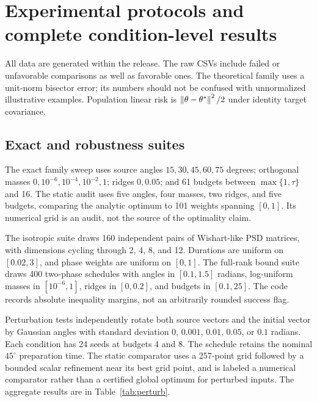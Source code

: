 \section{Experimental protocols and complete condition-level results}\label{app:experiments}
All data are generated within the release. The raw CSVs include failed or unfavorable comparisons as well as favorable ones. The theoretical family uses a unit-norm bisector error; its numbers should not be confused with unnormalized illustrative examples. Population linear risk is $\left\lVert\theta-\theta^*\right\rVert^2/2$ under identity target covariance.

\subsection{Exact and robustness suites}
The exact family sweep uses source angles $15,30,45,60,75$ degrees; orthogonal masses $0,10^{-6},10^{-4},10^{-2},1$; ridges $0,0.05$; and 61 budgets between $\max\{1,\tau\}$ and 16. The static audit uses five angles, four masses, two ridges, and five budgets, comparing the analytic optimum to 101 weights spanning $[0,1]$. Its numerical grid is an audit, not the source of the optimality claim.

The isotropic suite draws 160 independent pairs of Wishart-like PSD matrices, with dimensions cycling through 2, 4, 8, and 12. Durations are uniform on $[0.02,3]$, and phase weights are uniform on $[0,1]$. The full-rank bound suite draws 400 two-phase schedules with angles in $[0.1,1.5]$ radians, log-uniform masses in $[10^{-6},1]$, ridges in $[0,0.2]$, and budgets in $[0.1,25]$. The code records absolute inequality margins, not an arbitrarily rounded success flag.

Perturbation tests independently rotate both source vectors and the initial vector by Gaussian angles with standard deviation $0$, $0.001$, $0.01$, $0.05$, or $0.1$ radians. Each condition has 24 seeds at budgets 4 and 8. The schedule retains the nominal $45^\circ$ preparation time. The static comparator uses a 257-point grid followed by a bounded scalar refinement near its best grid point, and is labeled a numerical comparator rather than a certified global optimum for perturbed inputs. The aggregate results are in Table~\ref{tab:perturb}.

